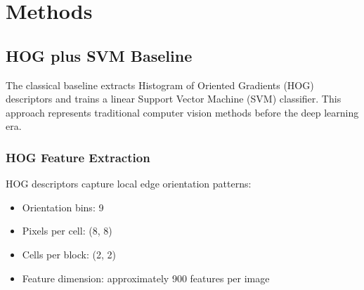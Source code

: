 \documentclass[12pt,a4paper]{article}
\begin{document}
\section{Methods}

\subsection{HOG plus SVM Baseline}
The classical baseline extracts Histogram of Oriented Gradients (HOG) descriptors and trains a linear Support Vector Machine (SVM) classifier. This approach represents traditional computer vision methods before the deep learning era.

\subsubsection{HOG Feature Extraction}
HOG descriptors capture local edge orientation patterns:
\begin{itemize}[leftmargin=*]
    \item Orientation bins: 9
    \item Pixels per cell: (8, 8)
    \item Cells per block: (2, 2)
    \item Feature dimension: approximately 900 features per image
\end{itemize}
\end{document}
